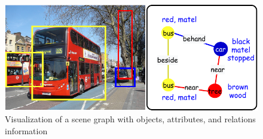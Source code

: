 \documentclass[letterpaper]{article} %
\begin{document}
\begin{figure}[ht] 
    \vspace{-0.1in}
    \centering 
    \includegraphics[scale=0.5]{./pic/intro.pdf} 
    \vspace{-0.1in}
    \caption{Visualization of a scene graph with objects, attributes, and relations information} 
    \label{scene-graph} 
    \vspace{-0.2in}
\end{figure}
\end{document}
